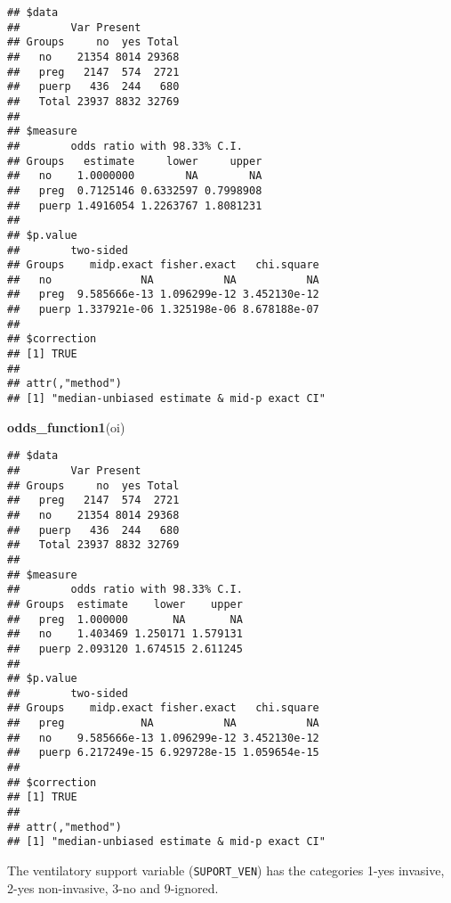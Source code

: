 \documentclass[
]{article}
\newenvironment{Shaded}{\begin{snugshade}}{\end{snugshade}}
\newcommand{\KeywordTok}[1]{\textcolor[rgb]{0.13,0.29,0.53}{\textbf{#1}}}
\newcommand{\NormalTok}[1]{#1}
\newcommand{\OperatorTok}[1]{\textcolor[rgb]{0.81,0.36,0.00}{\textbf{#1}}}
\newcommand{\StringTok}[1]{\textcolor[rgb]{0.31,0.60,0.02}{#1}}
\begin{document}
\begin{Shaded}
\end{Shaded}

\begin{verbatim}
## $data
##        Var Present
## Groups     no  yes Total
##   no    21354 8014 29368
##   preg   2147  574  2721
##   puerp   436  244   680
##   Total 23937 8832 32769
## 
## $measure
##        odds ratio with 98.33% C.I.
## Groups   estimate     lower     upper
##   no    1.0000000        NA        NA
##   preg  0.7125146 0.6332597 0.7998908
##   puerp 1.4916054 1.2263767 1.8081231
## 
## $p.value
##        two-sided
## Groups    midp.exact fisher.exact   chi.square
##   no              NA           NA           NA
##   preg  9.585666e-13 1.096299e-12 3.452130e-12
##   puerp 1.337921e-06 1.325198e-06 8.678188e-07
## 
## $correction
## [1] TRUE
## 
## attr(,"method")
## [1] "median-unbiased estimate & mid-p exact CI"
\end{verbatim}

\begin{Shaded}
\begin{Highlighting}[]
\KeywordTok{odds_function1}\NormalTok{(oi)}
\end{Highlighting}
\end{Shaded}

\begin{verbatim}
## $data
##        Var Present
## Groups     no  yes Total
##   preg   2147  574  2721
##   no    21354 8014 29368
##   puerp   436  244   680
##   Total 23937 8832 32769
## 
## $measure
##        odds ratio with 98.33% C.I.
## Groups  estimate    lower    upper
##   preg  1.000000       NA       NA
##   no    1.403469 1.250171 1.579131
##   puerp 2.093120 1.674515 2.611245
## 
## $p.value
##        two-sided
## Groups    midp.exact fisher.exact   chi.square
##   preg            NA           NA           NA
##   no    9.585666e-13 1.096299e-12 3.452130e-12
##   puerp 6.217249e-15 6.929728e-15 1.059654e-15
## 
## $correction
## [1] TRUE
## 
## attr(,"method")
## [1] "median-unbiased estimate & mid-p exact CI"
\end{verbatim}

The ventilatory support variable (\texttt{SUPORT\_VEN}) has the
categories 1-yes invasive, 2-yes non-invasive, 3-no and 9-ignored.
\end{document}
